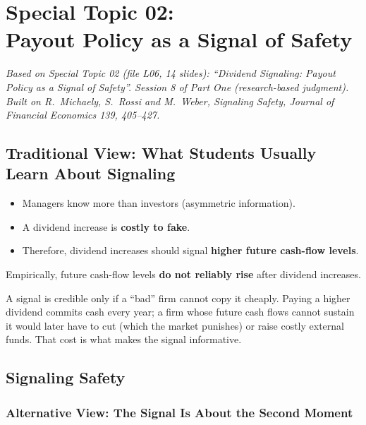 \chapter[Special Topic 02: Payout Policy as a Signal of Safety]{Special Topic 02:\\Payout Policy as a Signal of Safety}\label{ch:safety}

\emph{Based on Special Topic 02 (file L06, 14 slides): ``Dividend Signaling: Payout Policy as a Signal of Safety''. Session 8 of Part One (research-based judgment). Built on R.\ Michaely, S.\ Rossi and M.\ Weber, \emph{Signaling Safety}, \emph{Journal of Financial Economics} 139, 405--427.}

\section{Traditional View: What Students Usually Learn About Signaling}

\begin{itemize}
  \item Managers know more than investors (asymmetric information).
  \item A dividend increase is \textbf{costly to fake}.
  \item Therefore, dividend increases should signal \textbf{higher future cash-flow levels}.
\end{itemize}
\begin{keybox}
Empirically, future cash-flow levels \textbf{do not reliably rise} after dividend increases.
\end{keybox}
\begin{addbox}
A signal is credible only if a ``bad'' firm cannot copy it cheaply. Paying a higher dividend commits cash every year; a firm whose future cash flows cannot sustain it would later have to cut (which the market punishes) or raise costly external funds. That cost is what makes the signal informative.
\end{addbox}

\section{Signaling Safety}

\subsection{Alternative View: The Signal Is About the Second Moment}

